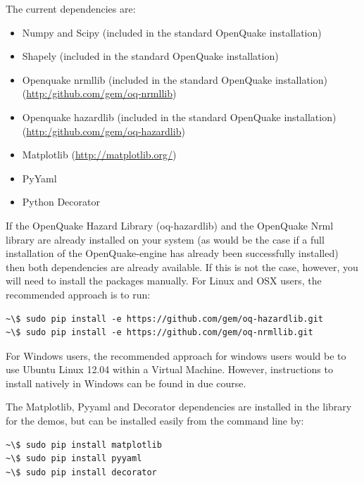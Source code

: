 The current dependencies are:
\begin{itemize}
\item Numpy and Scipy (included in the standard OpenQuake installation)
\item Shapely (included in the standard OpenQuake installation)
\item Openquake nrmllib (included in the standard OpenQuake installation) 
    \hfill \\ (\href{http:/github.com/gem/oq-nrmllib}{http:/github.com/gem/oq-nrmllib}) 
\item Openquake hazardlib (included in the standard OpenQuake installation) 
    \hfill \\ (\href{http:/github.com/gem/oq-hazardlib}{http:/github.com/gem/oq-hazardlib})
\item Matplotlib (\href{http://matplotlib.org/}{http://matplotlib.org/})
\item PyYaml
\item Python Decorator
\end{itemize}

If the OpenQuake Hazard Library (oq-hazardlib) and the OpenQuake Nrml library are already installed on your system (as would be the case if a full installation of the OpenQuake-engine has already been successfully installed) then both dependencies are already available. If this is not the case, however, you will need to install the packages manually. For Linux and OSX users, the recommended approach is to run:

\begin{Verbatim}[frame=single, commandchars=\\\{\}, fontsize=\scriptsize]
~\$ sudo pip install -e https://github.com/gem/oq-hazardlib.git
~\$ sudo pip install -e https://github.com/gem/oq-nrmllib.git
\end{Verbatim}

For Windows users, the recommended approach for windows users would be to use Ubuntu Linux 12.04 within a Virtual Machine. However, instructions to install natively in Windows can be found in due course.

The Matplotlib, Pyyaml and Decorator dependencies are installed in the library for the demos, but can be installed easily from the command line by:

\begin{Verbatim}[frame=single, commandchars=\\\{\}, fontsize=\scriptsize]
~\$ sudo pip install matplotlib
~\$ sudo pip install pyyaml
~\$ sudo pip install decorator
\end{Verbatim}

